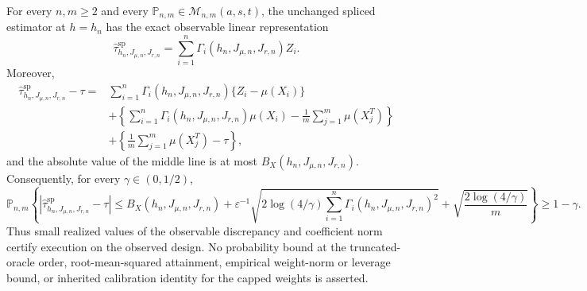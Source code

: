 For every \(n,m\ge2\) and every \(\mathbb P_{n,m}\in\mathcal M_{n,m}(a,s,t)\), the unchanged spliced estimator at \(h=h_n\) has the exact observable linear representation
\[
\widehat\tau^{\mathrm{sp}}_{h_n,J_{\mu,n},J_{r,n}}
=\sum_{i=1}^n\Gamma_i(h_n,J_{\mu,n},J_{r,n})Z_i.
\]
Moreover,
\[
\begin{aligned}
\widehat\tau^{\mathrm{sp}}_{h_n,J_{\mu,n},J_{r,n}}-\tau
={}&\sum_{i=1}^n\Gamma_i(h_n,J_{\mu,n},J_{r,n})\{Z_i-\mu(X_i)\}\\
&+\left\{\sum_{i=1}^n\Gamma_i(h_n,J_{\mu,n},J_{r,n})\mu(X_i)-\frac1m\sum_{j=1}^m\mu(X_j^T)\right\}\\
&+\left\{\frac1m\sum_{j=1}^m\mu(X_j^T)-\tau\right\},
\end{aligned}
\]
and the absolute value of the middle line is at most \(B_X(h_n,J_{\mu,n},J_{r,n})\). Consequently, for every \(\gamma\in(0,1/2)\),
\[
\mathbb P_{n,m}\!\left\{
\left|\widehat\tau^{\mathrm{sp}}_{h_n,J_{\mu,n},J_{r,n}}-\tau\right|
\le B_X(h_n,J_{\mu,n},J_{r,n})
+\varepsilon^{-1}\sqrt{2\log(4/\gamma)\sum_{i=1}^n\Gamma_i(h_n,J_{\mu,n},J_{r,n})^2}
+\sqrt{\frac{2\log(4/\gamma)}m}
\right\}\ge1-\gamma.
\]
Thus small realized values of the observable discrepancy and coefficient norm certify execution on the observed design. No probability bound at the truncated-oracle order, root-mean-squared attainment, empirical weight-norm or leverage bound, or inherited calibration identity for the capped weights is asserted.